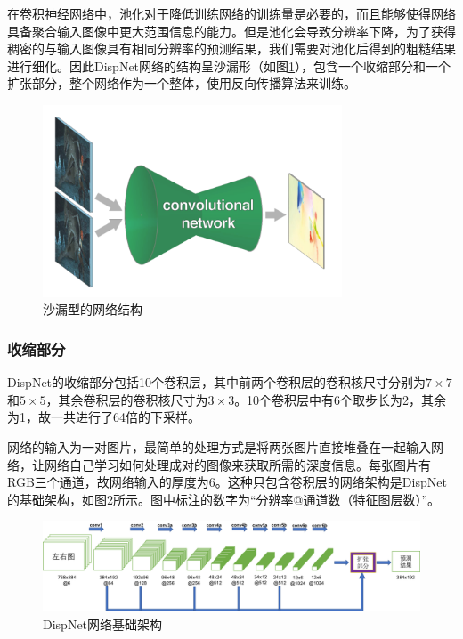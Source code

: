 在卷积神经网络中，池化对于降低训练网络的训练量是必要的，而且能够使得网络具备聚合输入图像中更大范围信息的能力。但是池化会导致分辨率下降，为了获得稠密的与输入图像具有相同分辨率的预测结果，我们需要对池化后得到的粗糙结果进行细化。因此DispNet网络的结构呈沙漏形（如图\ref{fig:4_1_dispnet_shape}），包含一个收缩部分和一个扩张部分，整个网络作为一个整体，使用反向传播算法来训练。

\begin{figure}[!htb]
	\centering\includegraphics[width=3.5in]{figures/4_1_dispnet_shape.png}
	\caption{沙漏型的网络结构\cite{dosovitskiy2015flownet}}\label{fig:4_1_dispnet_shape}
\end{figure}

\subsubsection{收缩部分}
DispNet的收缩部分包括10个卷积层，其中前两个卷积层的卷积核尺寸分别为$7\times 7$和$5\times 5$，其余卷积层的卷积核尺寸为$3\times 3$。10个卷积层中有6个取步长为2，其余为1，故一共进行了64倍的下采样。

网络的输入为一对图片，最简单的处理方式是将两张图片直接堆叠在一起输入网络，让网络自己学习如何处理成对的图像来获取所需的深度信息。每张图片有RGB三个通道，故网络输入的厚度为6。这种只包含卷积层的网络架构是DispNet的基础架构，如图\ref{fig:4_1_DispNet}所示。图中标注的数字为“分辨率@通道数（特征图层数）”。

\begin{figure}[!htbp]
	\centering\includegraphics[width=6in]{figures/4_1_dispnet_architecture}
	\caption{DispNet网络基础架构}\label{fig:4_1_DispNet}
\end{figure}

